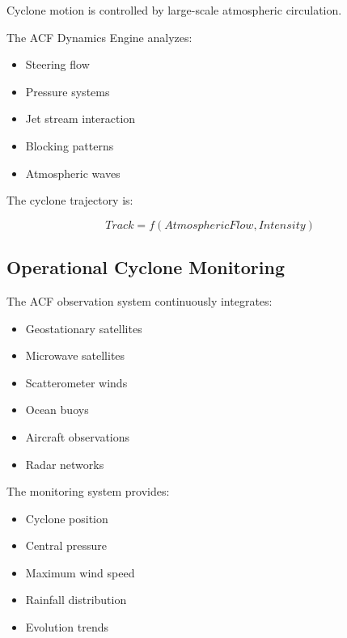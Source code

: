 Cyclone motion is controlled by large-scale atmospheric circulation.

The ACF Dynamics Engine analyzes:

\begin{itemize}

\item Steering flow

\item Pressure systems

\item Jet stream interaction

\item Blocking patterns

\item Atmospheric waves

\end{itemize}


The cyclone trajectory is:

\[
Track
=
f(AtmosphericFlow,Intensity)
\]



\subsection{Operational Cyclone Monitoring}

The ACF observation system continuously integrates:

\begin{itemize}

\item Geostationary satellites

\item Microwave satellites

\item Scatterometer winds

\item Ocean buoys

\item Aircraft observations

\item Radar networks

\end{itemize}


The monitoring system provides:

\begin{itemize}

\item Cyclone position

\item Central pressure

\item Maximum wind speed

\item Rainfall distribution

\item Evolution trends

\end{itemize}


